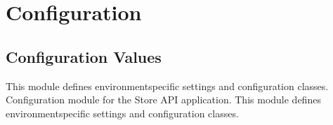 \documentclass[letterpaper,10pt,openany,oneside,english]{sphinxmanual}
\begin{document}
\sphinxstepscope


\chapter{Configuration}
\label{\detokenize{modules/config:configuration}}\label{\detokenize{modules/config::doc}}

\section{Configuration Values}
\label{\detokenize{modules/config:configuration-values}}
\sphinxAtStartPar
This module defines environment\sphinxhyphen{}specific settings and configuration classes.
\label{\detokenize{modules/config:module-storeapi.config}}
\sphinxAtStartPar
Configuration module for the Store API application.
This module defines environment\sphinxhyphen{}specific settings and configuration classes.
\end{document}
